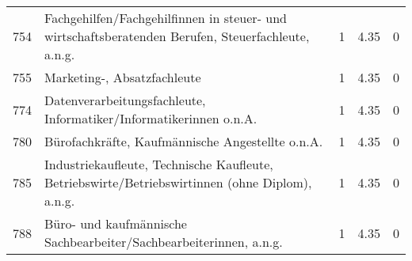 \begin{longtable}{lXrrr}
     754 &
     \multicolumn{1}{X}{ Fachgehilfen/Fachgehilfinnen in steuer- und wirtschaftsberatenden Berufen, Steuerfachleute, a.n.g.   } &


       \num{1} &
       \num[round-mode=places,round-precision=2]{4,35} &
         \num[round-mode=places,round-precision=2]{0} \\

     755 &
     \multicolumn{1}{X}{ Marketing-, Absatzfachleute   } &


       \num{1} &
       \num[round-mode=places,round-precision=2]{4,35} &
         \num[round-mode=places,round-precision=2]{0} \\

     774 &
     \multicolumn{1}{X}{ Datenverarbeitungsfachleute, Informatiker/Informatikerinnen o.n.A.   } &


       \num{1} &
       \num[round-mode=places,round-precision=2]{4,35} &
         \num[round-mode=places,round-precision=2]{0} \\

     780 &
     \multicolumn{1}{X}{ Bürofachkräfte, Kaufmännische Angestellte o.n.A.   } &


       \num{1} &
       \num[round-mode=places,round-precision=2]{4,35} &
         \num[round-mode=places,round-precision=2]{0} \\

     785 &
     \multicolumn{1}{X}{ Industriekaufleute, Technische Kaufleute, Betriebswirte/Betriebswirtinnen (ohne Diplom), a.n.g.   } &


       \num{1} &
       \num[round-mode=places,round-precision=2]{4,35} &
         \num[round-mode=places,round-precision=2]{0} \\

     788 &
     \multicolumn{1}{X}{ Büro- und kaufmännische Sachbearbeiter/Sachbearbeiterinnen, a.n.g.   } &


       \num{1} &
       \num[round-mode=places,round-precision=2]{4,35} &
         \num[round-mode=places,round-precision=2]{0} \\


\end{longtable}
